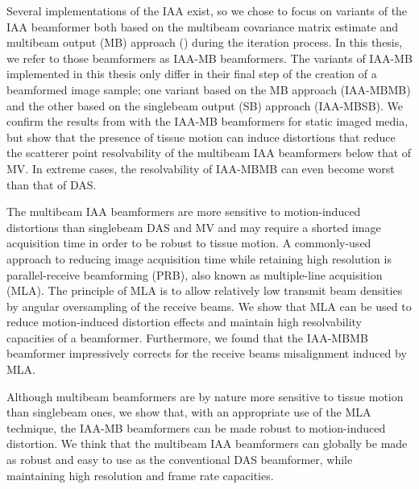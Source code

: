 Several implementations of the IAA exist, so we chose to focus on variants of the IAA beamformer both based on the multibeam covariance matrix estimate and multibeam output (MB) approach (\cite{Jensen_IAA}) during the iteration process.
In this thesis, we refer to those beamformers as IAA-MB beamformers.
The variants of IAA-MB implemented in this thesis only differ in their final step of the creation of a beamformed image sample; one variant based on the MB approach (IAA-MBMB) and the other based on the singlebeam output (SB) approach (IAA-MBSB).
We confirm the results from \cite{Jensen_IAA} with the IAA-MB beamformers for static imaged media, but show that the presence of tissue motion can induce distortions that reduce the scatterer point resolvability of the multibeam IAA beamformers below that of MV.
In extreme cases, the resolvability of IAA-MBMB can even become worst than that of DAS.

The multibeam IAA beamformers are more sensitive to motion-induced distortions than singlebeam DAS and MV and may require a shorted image acquisition time in order to be robust to tissue motion.
A commonly-used approach to reducing image acquisition time while retaining high resolution is parallel-receive beamforming (PRB), also known as multiple-line acquisition (MLA).
The principle of MLA is to allow relatively low transmit beam densities by angular oversampling of the receive beams.
We show that MLA can be used to reduce motion-induced distortion effects and maintain high resolvability capacities of a beamformer.
Furthermore, we found that the IAA-MBMB beamformer impressively corrects for the receive beams misalignment induced by MLA.

Although multibeam beamformers are by nature more sensitive to tissue motion than singlebeam ones, we show that, with an appropriate use of the MLA technique, the IAA-MB beamformers can be made robust to motion-induced distortion.
We think that the multibeam IAA beamformers can globally be made as robust and easy to use as the conventional DAS beamformer, while maintaining high resolution and frame rate capacities.

